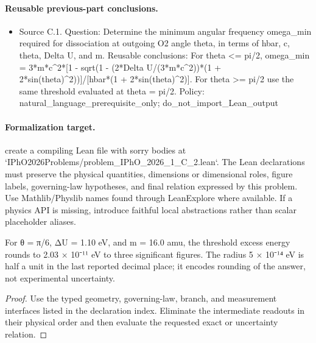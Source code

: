 \paragraph{Reusable previous-part conclusions.}
\begin{itemize}
\item Source C.1. Question: Determine the minimum angular frequency omega\_min required for dissociation at outgoing O2 angle theta, in terms of hbar, c, theta, Delta U, and m. Reusable conclusions: For theta <= pi/2, omega\_min = 3*m*c\textasciicircum{}2*[1 - sqrt(1 - (2*Delta U/(3*m*c\textasciicircum{}2))*(1 + 2*sin(theta)\textasciicircum{}2))]/[hbar*(1 + 2*sin(theta)\textasciicircum{}2)]. For theta >= pi/2 use the same threshold evaluated at theta = pi/2. Policy: natural\_language\_prerequisite\_only; do\_not\_import\_Lean\_output
\end{itemize}

\paragraph{Formalization target.}
create a compiling Lean file with sorry bodies at `IPhO2026Problems/problem\_IPhO\_2026\_1\_C\_2.lean`. The Lean declarations must preserve the physical quantities, dimensions or dimensional roles, figure labels, governing-law hypotheses, and final relation expressed by this problem.
Use Mathlib/Physlib names found through LeanExplore where available. If a physics API is missing, introduce faithful local abstractions rather than scalar placeholder aliases.

\begin{theorem}
  \label{thm:physics:IPhO_2026_1_C_2:target}
  For θ = π/6, ΔU = 1.10 eV, and m = 16.0 amu, the threshold excess energy rounds to 2.03 × 10⁻¹¹ eV to three significant figures. The radius 5 × 10⁻¹⁴ eV is half a unit in the last reported decimal place; it encodes rounding of the answer, not experimental uncertainty.
\end{theorem}
\begin{proof}
  Use the typed geometry, governing-law, branch, and measurement interfaces listed in the declaration index.  Eliminate the intermediate readouts in their physical order and then evaluate the requested exact or uncertainty relation.
\end{proof}
